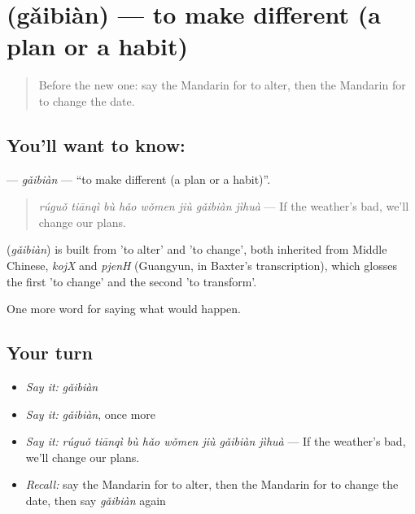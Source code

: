 \section[\texorpdfstring{\zh{改变} (gǎibiàn)}{改变 (gǎibiàn)}]{ (gǎibiàn) — to make different (a plan or a habit)}

\label{lesson:ZH-C392-gaibian}



\begin{quote}
Before the new one: say the Mandarin for to alter, then the Mandarin for to change the date.
\end{quote}

\subsection*{You'll want to know: }
\textbf{} — \emph{gǎibiàn} — \textquotedblleft{}to make different (a plan or a habit)\textquotedblright{}.

\begin{quote}
\emph{rúguǒ tiānqì bù hǎo wǒmen jiù gǎibiàn jìhuà} — If the weather's bad, we'll change our plans.
\end{quote}

\begin{cousinweb}
\textbf{} (\emph{gǎibiàn}) is built from  'to alter' and  'to change', both inherited from Middle Chinese, \emph{kojX} and \emph{pjenH} (Guangyun, in Baxter's transcription), which glosses the first 'to change' and the second 'to transform'.
\end{cousinweb}

\begin{grammarlens}[title={What you've built}]
One more word for saying what would happen.
\end{grammarlens}

\subsection*{Your turn}
\begin{itemize}
\raggedright
  \item \emph{Say it:} \emph{gǎibiàn}
  \item \emph{Say it:} \emph{gǎibiàn}, once more
  \item \emph{Say it:} \emph{rúguǒ tiānqì bù hǎo wǒmen jiù gǎibiàn jìhuà} — If the weather's bad, we'll change our plans.
  \item \emph{Recall:} say the Mandarin for to alter, then the Mandarin for to change the date, then say \emph{gǎibiàn} again
\end{itemize}

